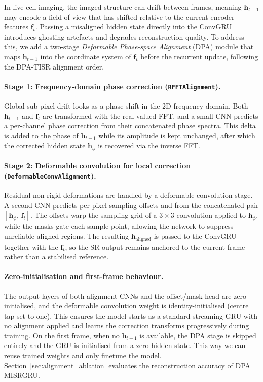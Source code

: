 In live-cell imaging, the imaged structure can drift between frames, meaning
$\mathbf{h}_{t-1}$ may encode a field of view that has shifted relative to the
current encoder features $\mathbf{f}_t$.
Passing a misaligned hidden state directly into the ConvGRU introduces ghosting
artefacts and degrades reconstruction quality.
To address this, we add a two-stage \emph{Deformable Phase-space Alignment} (DPA)
module that maps $\mathbf{h}_{t-1}$ into the coordinate system of $\mathbf{f}_t$
before the recurrent update, following the DPA-TISR\cite{qiao2025dpatisr} alignment order.

\paragraph{Stage 1: Frequency-domain phase correction (\texttt{RFFTAlignment}).}
Global sub-pixel drift looks as a phase shift in the 2D frequency domain.
Both $\mathbf{h}_{t-1}$ and $\mathbf{f}_t$ are transformed with the real-valued FFT,
and a small CNN predicts a per-channel phase correction from their concatenated phase
spectra.
This delta is added to the phase of $\mathbf{h}_{t-1}$ while its amplitude is kept
unchanged, after which the corrected hidden state $\mathbf{h}_\phi$ is recovered via
the inverse FFT.

\paragraph{Stage 2: Deformable convolution for local correction (\texttt{DeformableConvAlignment}).}
Residual non-rigid deformations are handled by a deformable convolution stage.
A second CNN predicts per-pixel sampling offsets and from the
concatenated pair $[\mathbf{h}_\phi,\, \mathbf{f}_t]$.
The offsets warp the sampling grid of a $3{\times}3$ convolution applied to
$\mathbf{h}_\phi$, while the masks gate each sample point, allowing the network to
suppress unreliable aligned regions.
The resulting $\mathbf{h}_\text{aligned}$ is passed to the ConvGRU together with the
$\mathbf{f}_t$, so the SR output remains anchored to the current
frame rather than a stabilised reference.

\paragraph{Zero-initialisation and first-frame behaviour.}
The output layers of both alignment CNNs and the offset/mask head are zero-initialised,
and the deformable convolution weight is identity-initialised (centre tap set to one).
This ensures the model starts as a standard streaming GRU with no alignment applied and
learns the correction transforms progressively during training.
On the first frame, when no $\mathbf{h}_{t-1}$ is available, the DPA stage is skipped
entirely and the GRU is initialised from a zero hidden state. This way we can reuse  
trained weights and only finetune the model. Section~\ref{sec:alignment_ablation} evaluates
the reconstruction accuracy of DPA MISRGRU.

